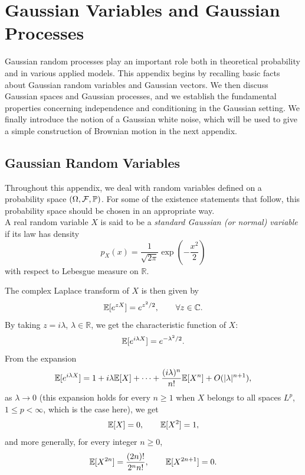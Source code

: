 \documentclass[../Main.tex]{subfiles}
\begin{document}


\chapter{Gaussian Variables and Gaussian Processes}
Gaussian random processes play an important role both in theoretical probability and in various applied models. This appendix begins by recalling basic facts about Gaussian random variables and Gaussian vectors. We then discuss Gaussian spaces and Gaussian processes, and we establish the fundamental properties concerning independence and conditioning in the Gaussian setting. We ﬁnally introduce the notion of a Gaussian white noise, which will be used to give a simple construction of Brownian motion in the next appendix.\label{sec:gaussian_sec}


\section{Gaussian Random Variables}

Throughout this appendix, we deal with random variables defined on a probability space $(\Omega,\mathcal F, \mathbb{P})$. For some of the existence statements that follow, this probability space should be chosen in an appropriate way. \\
A real random variable $X$ is said to be a \emph{standard Gaussian (or normal) variable} if its law has density
\[ p_X(x) = \frac{1}{\sqrt{2\pi}} \exp\left(-\frac{x^2}{2}\right) \]
with respect to Lebesgue measure on $\mathbb R$.

The complex Laplace transform of $X$ is then given by
\[ \mathbb{E}[e^{zX}] = e^{z^2/2}, \qquad \forall z\in\mathbb C.\]
By taking $z=i\lambda$, $\lambda\in\mathbb R$, we get the characteristic function of $X$:
\[ \mathbb{E}[e^{i\lambda X}] = e^{-\lambda^2/2}. \]
From the expansion
\[ \mathbb{E}[e^{i\lambda X}] = 1 + i\lambda \mathbb{E}[X] + \cdots + \frac{(i\lambda)^n}{n!}\mathbb{E}[X^n] + O(|\lambda|^{n+1}), \]
as $\lambda\to 0$ (this expansion holds for every $n\geq 1$ when $X$ belongs to all spaces $L^p$, $1\leq p<\infty$, which is the case here), we get
\[ \mathbb{E}[X]=0,\qquad \mathbb{E}[X^2]=1, \]
and more generally, for every integer $n\geq 0$,
\[ \mathbb{E}[X^{2n}] = \frac{(2n)!}{2^n n!}, \qquad \mathbb{E}[X^{2n+1}]=0. \]
\end{document}
